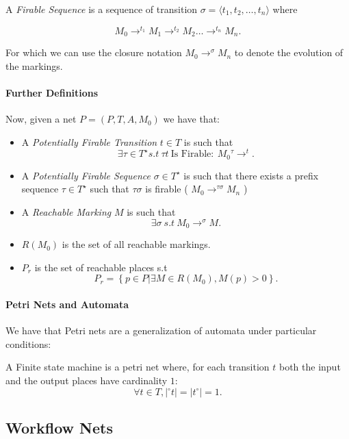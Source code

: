 \documentclass[openright, twoside, twocolumn]{report}
\begin{document}
    A \emph{Firable Sequence} is a sequence of transition $\sigma = \langle t_1, t_2, \ldots, t_n \rangle$ where

    \[
      M_0 \to^{ t_1} M_1 \to^{ t_2} M_2 \ldots \to^{ t_n} M_n
    .\]

    For which we can use the closure notation $ M_0 \to^{\sigma} M_n$ to denote the evolution of the markings.

  \paragraph{Further Definitions}

    Now, given a net $P = (P, T, A, M_0)$ we have that:
    \begin{itemize}
      \item A \emph{Potentially Firable Transition}  $t \in T$  is such that
      \[
        \exists \tau \in T^{\star} s.t\ \tau t\ \text{Is Firable}:\ M_0 {}^{\tau}\to^{t}
      .\]
      \item A \emph{Potentially Firable Sequence} $\sigma \in T^{\star}$ is such that
      there exists a prefix sequence $\tau \in T^{\star}$ such that $\tau \sigma$ is firable (
        $M_0 \to^{\tau \sigma} M_n$
        )
      \item A \emph{Reachable Marking} $M$ is such that
      \[
         \exists \sigma\ s.t\ M_0 \to^{\sigma} M
      .\]
      \item $R( M_0)$ is the set of all reachable markings.
      \item $P_r$ is the set of reachable places s.t
      \[
        P_r = \left\{ p \in  P | \exists  M \in  R( M_0), M(p) > 0 \right\}
      .\]
    \end{itemize}

    \paragraph{Petri Nets and Automata}

    We have that Petri nets are a generalization of automata under particular conditions:

    \begin{definition}
      A Finite state machine is a petri net where, for each transition $t$ both
      the input and the output places have cardinality $1$:
      \[
        \forall  t \in  T, |{}^{\circ}t| = |t^{\circ}| = 1
      .\]
    \end{definition}

    \subsection{Workflow Nets}
\end{document}
